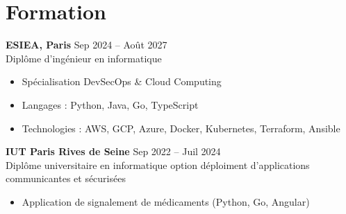 \section{Formation}\label{sec:formation}
\textbf{ESIEA, Paris} \hfill Sep 2024 -- Août 2027 \\
Diplôme d'ingénieur en informatique
\begin{itemize}
    \item Spécialisation DevSecOps & Cloud Computing
    \item Langages : Python, Java, Go, TypeScript
    \item Technologies : AWS, GCP, Azure, Docker, Kubernetes, Terraform, Ansible
\end{itemize}

\textbf{IUT Paris Rives de Seine} \hfill Sep 2022 -- Juil 2024 \\
Diplôme universitaire en informatique option déploiment d'applications communicantes et sécurisées
\begin{itemize}
    \item Application de signalement de médicaments (Python, Go, Angular)
\end{itemize}
